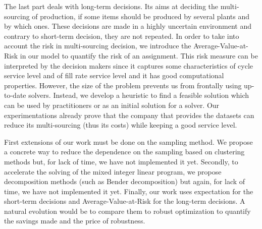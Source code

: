 The last part deals with long-term decisions.
Its aims at deciding the multi-sourcing of production, \ie if some items should be produced by several plants and by which ones.
These decisions are made in a highly uncertain environment and contrary to short-term decision, they are not repeated.
In order to take into account the risk in multi-sourcing decision, we introduce the Average-Value-at-Risk in our model to quantify the risk of an assignment.
This risk measure can be interpreted by the decision makers since it captures some characteristics of cycle service level and of fill rate service level and it has good computational properties.
However, the size of the problem prevents us from frontally using up-to-date solvers.
Instead, we develop a heuristic to find a feasible solution which can be used by practitioners or as an initial solution for a solver.
Our experimentations already prove that the company that provides the datasets can reduce its multi-sourcing (thus its costs) while keeping a good service level.


First extensions of our work must be done on the sampling method.
We propose a concrete way to reduce the dependence on the sampling based on clustering methods but, for lack of time, we have not implemented it yet.
Secondly, to accelerate the solving of the mixed integer linear program, we propose decomposition methods (such as Bender decomposition) but again, for lack of time, we have not implemented it yet.
Finally, our work uses expectation for the short-term decisions and Average-Value-at-Risk for the long-term decisions.
A natural evolution would be to compare them to robust optimization to quantify the savings made and the price of robustness.

